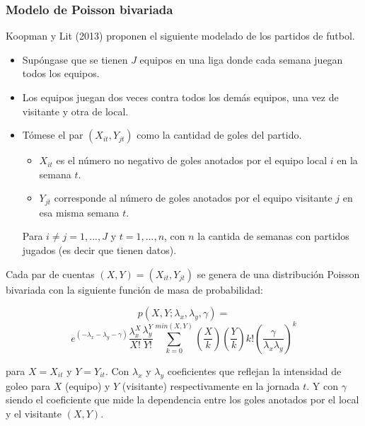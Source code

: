  \subsubsection{Modelo de Poisson bivariada}
 \label{subsubsec:bivariate-poisson}

Koopman y Lit (2013) \cite{koopman2013dynamic} proponen el siguiente modelado de los partidos de futbol.
\begin{itemize}

	\item Supóngase que se tienen $J$ equipos en una liga donde cada semana juegan todos los equipos.

	\item Los equipos juegan dos veces contra todos los demás equipos, una vez de visitante y otra de local.
	\item Tómese el par $(X_{it},Y_{jt})$ como la cantidad de goles del partido. 
	\begin{itemize}
	
		\item $X_{it}$ es el número no negativo de goles anotados por el equipo local $i$ en la semana $t$.
		\item $Y_{jt}$ corresponde al número de goles anotados por el equipo visitante $j$ en esa misma semana $t$.
	\end{itemize}
		
		Para $i\neq j = 1, ...,J$ y $t=1,...,n$, con $n$ la cantida de semanas con partidos jugados (es decir que tienen datos).
\end{itemize}

Cada par de cuentas $(X,Y) = (X_{it},Y_{jt})$ se genera de una distribución Poisson bivariada con la siguiente función de masa de probabilidad:
 
 \[p(X,Y;\lambda_x,\lambda_y,\gamma) =\]
  \[e^{(-\lambda_x-\lambda_y-\gamma)}\frac{\lambda^X_x}{X!}\frac{\lambda^Y_y}{Y!}\sum_{k=0}^{min(X,Y)}\left(\frac{X}{k}\right)\left(\frac{Y}{k}\right)k!\left(\frac{\gamma}{\lambda_x\lambda_y}\right)^k \]

 para $X = X_{it}$ y $Y = Y_{it}$.
 Con $\lambda_x$ y $\lambda_y$ coeficientes que reflejan la intensidad de goleo para $X$ (equipo) y $Y$ (visitante) respectivamente en la jornada $t$.
 Y con $\gamma$ siendo el coeficiente que mide la dependencia entre los goles anotados por el local y el visitante $(X,Y)$. 

